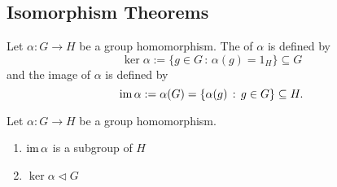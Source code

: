 
\subsection{Isomorphism Theorems}%
\label{sub:isomorphism_theorems}

\begin{defn}
\label{defn:kernel_and_image}
  Let $\alpha: G \to H$ be a group homomorphism. The  of $\alpha$ is defined by
  \begin{equation*}
    \ker \alpha := \{g \in G \, : \, \alpha(g) = 1_H \} \subseteq G
  \end{equation*}
  and the image of $\alpha$ is defined by
  \begin{equation*}
    \operatorname{im} \alpha := \alpha(G) = \{\alpha(g) \, : \, g \in G \} \subseteq H.
  \end{equation*}
\end{defn}

\begin{propo}
\label{propo:image_of_hm_is_a_subgroup_n_kernel_of_hm_is_a_normal_subgroup}
  Let $\alpha : G \to H$ be a group homomorphism.
  \begin{enumerate}
    \item $\operatorname{im} \alpha$ is a subgroup of $H$
    \item $\ker \alpha \triangleleft G$
  \end{enumerate}
\end{propo}

